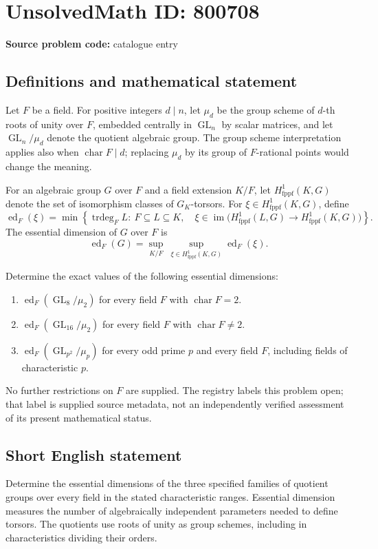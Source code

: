 \documentclass[11pt]{article}
\begin{document}
\section*{UnsolvedMath ID: 800708}
\textbf{Source problem code:} catalogue entry
\subsection{Definitions and mathematical statement}
Let \(F\) be a field. For positive integers \(d\mid n\), let \(\mu_d\) be the group scheme of \(d\)-th roots of unity over \(F\), embedded centrally in \(\operatorname{GL}_n\) by scalar matrices, and let \(\operatorname{GL}_n/\mu_d\) denote the quotient algebraic group. The group scheme interpretation applies also when \(\operatorname{char}F\mid d\); replacing \(\mu_d\) by its group of \(F\)-rational points would change the meaning.

For an algebraic group \(G\) over \(F\) and a field extension \(K/F\), let \(H^1_{\mathrm{fppf}}(K,G)\) denote the set of isomorphism classes of \(G_K\)-torsors. For \(\xi\in H^1_{\mathrm{fppf}}(K,G)\), define
\[
\operatorname{ed}_F(\xi)=\min\left\{\operatorname{trdeg}_F L:\ F\subseteq L\subseteq K,\quad \xi\in\operatorname{im}\bigl(H^1_{\mathrm{fppf}}(L,G)\longrightarrow H^1_{\mathrm{fppf}}(K,G)\bigr)\right\}.
\]
The essential dimension of \(G\) over \(F\) is
\[
\operatorname{ed}_F(G)=\sup_{K/F}\ \sup_{\xi\in H^1_{\mathrm{fppf}}(K,G)}\operatorname{ed}_F(\xi).
\]

Determine the exact values of the following essential dimensions:
\begin{enumerate}
\item \(\operatorname{ed}_F(\operatorname{GL}_{8}/\mu_2)\) for every field \(F\) with \(\operatorname{char}F=2\).
\item \(\operatorname{ed}_F(\operatorname{GL}_{16}/\mu_2)\) for every field \(F\) with \(\operatorname{char}F\ne2\).
\item \(\operatorname{ed}_F(\operatorname{GL}_{p^2}/\mu_p)\) for every odd prime \(p\) and every field \(F\), including fields of characteristic \(p\).
\end{enumerate}
No further restrictions on \(F\) are supplied. The registry labels this problem open; that label is supplied source metadata, not an independently verified assessment of its present mathematical status.
\subsection{Short English statement}
Determine the essential dimensions of the three specified families of quotient groups over every field in the stated characteristic ranges. Essential dimension measures the number of algebraically independent parameters needed to define torsors. The quotients use roots of unity as group schemes, including in characteristics dividing their orders.
\end{document}
